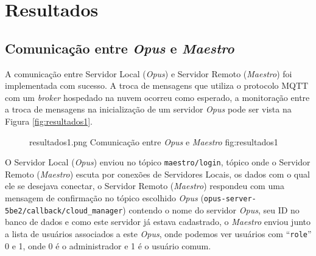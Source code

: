 \chapter{Resultados}
\label{resultados}

\section{Comunicação entre \emph{Opus} e \emph{Maestro}}
\label{resultados:comunicacao}
A comunicação entre Servidor Local (\emph{Opus}) e Servidor Remoto (\emph{Maestro}) foi implementada com sucesso.
A troca de mensagens que utiliza o protocolo MQTT com um \emph{broker} hospedado na nuvem ocorreu como esperado,
a monitoração entre a troca de mensagens na inicialização de um servidor \emph{Opus} pode ser vista na Figura \ref{fig:resultados1}.
\begin{figure}[h!]
    {resultados1.png}
    {Comunicação entre \emph{Opus} e \emph{Maestro}}
    {fig:resultados1}
\end{figure}
O Servidor Local (\emph{Opus}) enviou no tópico \lstinline{maestro/login}, tópico onde o Servidor Remoto (\emph{Maestro}) escuta por conexões
de Servidores Locais, os dados com o qual ele se desejava conectar, o Servidor Remoto (\emph{Maestro}) respondeu com uma mensagem de confirmação
no tópico escolhido \emph{Opus} (\lstinline{opus-server-5be2/callback/cloud_manager}) contendo o nome do servidor \emph{Opus}, seu ID no banco de dados
e como este servidor já estava cadastrado, o \emph{Maestro} enviou junto a lista de usuários associados a este \emph{Opus}, onde podemos ver
usuários com ``\lstinline{role}'' 0 e 1, onde 0 é o administrador e 1 é o usuário comum. 
